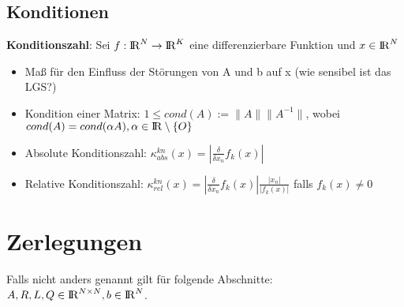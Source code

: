 \documentclass[10pt,a4paper]{article}
\def\realnumbers{{\rm I\!R}}
\newcommand{\norm}[1]{\lVert#1\rVert}
\begin{document}
	\subsection{Konditionen}
	\textbf{Konditionszahl}:
	Sei $f: \realnumbers^N \rightarrow \realnumbers^K$ eine differenzierbare Funktion und $x \in \realnumbers^N$
	\begin{itemize}
		\item Maß für den Einfluss der Störungen von A und b auf x (wie sensibel ist das LGS?)
		\item Kondition einer Matrix: $1 \leq cond(A) := \norm{A}\norm{A^{-1}}$, wobei $cond(A) = cond(\alpha A), \alpha\in\realnumbers\setminus\{O\}$
		\item Absolute Konditionszahl: $\kappa^{kn}_{abs}(x) = |\frac{\delta}{\delta x_n}f_k(x)|$
		\item Relative Konditionszahl: $\kappa^{kn}_{rel}(x) = |\frac{\delta}{\delta x_n}f_k(x)| \frac{|x_n|}{|f_k(x)|}$ falls $f_k(x) \neq 0$
	\end{itemize}
	\newpage
	\section{Zerlegungen}
	Falls nicht anders genannt gilt für folgende Abschnitte: $A, R, L, Q \in \realnumbers^{N \times N}, b \in \realnumbers^N$.
\end{document}
